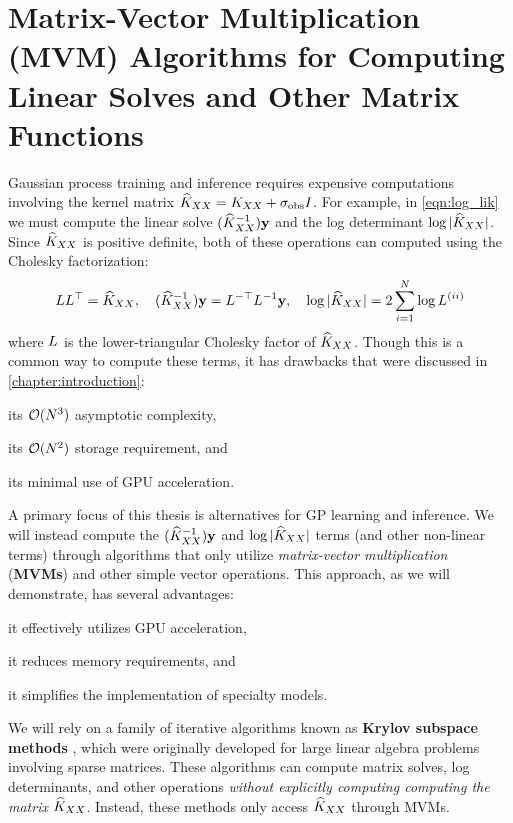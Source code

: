\section{Matrix-Vector Multiplication (MVM) Algorithms for Computing Linear Solves and Other Matrix Functions}
\label{sec:mvms}

Gaussian process training and inference requires expensive computations involving the kernel matrix $\widehat{K}_{XX} = K_{XX} + \sigma_\text{obs} I$.
For example, in \cref{eqn:log_lik} we must compute the linear solve $(\widehat{K}_{XX}^{-1}) \mathbf{y}$ and the log determinant $\log \vert \widehat{K}_{XX} \vert$.
Since $\widehat{K}_{XX}$ is positive definite, both of these operations can computed using the Cholesky factorization:
%
\[
  L L^\top = \widehat{K}_{XX}, \quad
  (\widehat{K}_{XX}^{-1}) \mathbf{y} = L^{-\top} L^{-1} \mathbf{y}, \quad
  \log \vert \widehat{K}_{XX} \vert = 2 \sum_{i=1}^N \log L^{(ii)}
\]
%
where $L$ is the lower-triangular Cholesky factor of $\widehat{K}_{XX}$.
Though this is a common way to compute these terms, it has drawbacks that were discussed in \cref{chapter:introduction}:
%
\begin{enumerate*}
  \item its $\bigo{N^3}$ asymptotic complexity,
  \item its $\bigo{N^2}$ storage requirement, and
  \item its minimal use of GPU acceleration.
\end{enumerate*}

A primary focus of this thesis is alternatives for GP learning and inference.
We will instead compute the $(\widehat{K}_{XX}^{-1}) \mathbf{y}$ and $\log \vert \widehat{K}_{XX} \vert$ terms (and other non-linear terms) through algorithms that only utilize \emph{matrix-vector multiplication} ({\bf MVMs}) and other simple vector operations.
This approach, as we will demonstrate, has several advantages:
%
\begin{enumerate*}
  \item it effectively utilizes GPU acceleration,
  \item it reduces memory requirements, and
  \item it simplifies the implementation of specialty models.
\end{enumerate*}
%
We will rely on a family of iterative algorithms known as {\bf Krylov subspace methods} \citep[e.g.][]{saad2003iterative,van2003iterative}, which were originally developed for large linear algebra problems involving sparse matrices.
These algorithms can compute matrix solves, log determinants, and other operations \emph{without explicitly computing computing the matrix} $\widehat{K}_{XX}$.
Instead, these methods only access $\widehat{K}_{XX}$ through MVMs.

